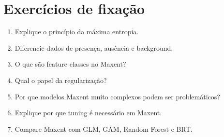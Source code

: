 \section{Exercícios de fixação}

\begin{enumerate}
	\item Explique o princípio da máxima entropia.
	\item Diferencie dados de presença, ausência e background.
	\item O que são feature classes no Maxent?
	\item Qual o papel da regularização?
	\item Por que modelos Maxent muito complexos podem ser problemáticos?
	\item Explique por que tuning é necessário em Maxent.
	\item Compare Maxent com GLM, GAM, Random Forest e BRT.
\end{enumerate}


